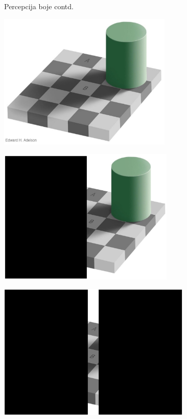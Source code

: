 \documentclass[9pt]{beamer}
\begin{document}
\begin{frame}{Percepcija boje contd.}
	\only<1> {
	\begin{center}
		\includegraphics[height=6.5cm]{slike/color_slide_113_cropped.jpg}
	\end{center}
	}
	 {
	\begin{center}
		\includegraphics[height=6.5cm]{slike/color_slide_114_cropped.jpg}
	\end{center}
	}	
	 {
	\begin{center}
		\includegraphics[height=6.5cm]{slike/color_slide_115_cropped.jpg}
	\end{center}
	}
	 {
	\begin{center}

\end{center}}
\end{frame}
\end{document}
